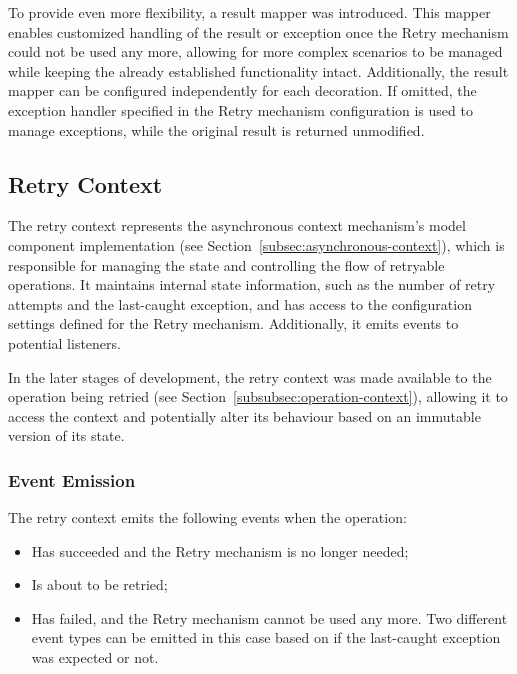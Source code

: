 To provide even more flexibility, a result mapper was introduced.
This mapper enables customized handling of the result or exception once the Retry mechanism could not be used any more,
allowing for more complex scenarios to be managed while keeping the already established functionality intact.
Additionally, the result mapper can be configured independently for each decoration.
If omitted, the exception handler specified in the Retry mechanism configuration is used to manage exceptions,
while the original result is returned unmodified.

\subsection{Retry Context}\label{subsec:retry-context}

The retry context represents the asynchronous context mechanism's model component implementation
(see Section~\ref{subsec:asynchronous-context}),
which is responsible for managing the state and controlling the flow of retryable operations.
It maintains internal state information, such as the number of retry attempts and the last-caught exception,
and has access to the configuration settings defined for the Retry mechanism.
Additionally, it emits events to potential listeners.

In the later stages of development,
the retry context was made available to the operation being retried (see Section~\ref{subsubsec:operation-context}),
allowing it to access the context and potentially alter its behaviour based on an immutable version of its state.

\subsubsection{Event Emission}\label{subsubsec:retry-context-event-emission}

The retry context emits the following events when the operation:

\begin{itemize}
    \item Has succeeded and the Retry mechanism is no longer needed;
    \item Is about to be retried;
    \item Has failed, and the Retry mechanism cannot be used any more.
    Two different event types can be emitted in this case based on if the last-caught exception was expected or not.
\end{itemize}

